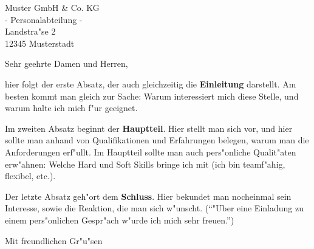 \documentclass[fontsize=12pt]{scrlttr2}
\begin{document}
 \begin{letter}{Muster GmbH \& Co. KG\\- Personalabteilung -\\
		     Landstra"se 2\\12345 Musterstadt} 		
 
\opening{Sehr geehrte Damen und Herren,}
 
hier folgt der erste Absatz, der auch gleichzeitig die 
\textbf{Einleitung} darstellt. Am besten kommt man gleich zur 
Sache: Warum interessiert mich diese Stelle, und warum halte
ich mich f"ur geeignet.
 
Im zweiten Absatz beginnt der \textbf{ Hauptteil}. Hier stellt 
man sich vor, und hier sollte man anhand von Qualifikationen 
und Erfahrungen belegen, warum man die Anforderungen
erf"ullt. Im Hauptteil sollte man auch pers"onliche Qualit"aten 
erw"ahnen: Welche Hard und Soft Skills bringe ich mit (ich bin 
teamf"ahig, flexibel, etc.).
 
Der letzte Absatz geh"ort dem \textbf{Schluss}. Hier bekundet 
man nocheinmal sein Interesse, sowie die Reaktion, die man sich 
w"unscht. ("`"Uber eine Einladung zu einem pers"onlichen 
Gespr"ach w"urde ich mich sehr freuen."')
 
\closing{Mit freundlichen Gr"u"sen}
 
 
 
 
\end{letter}
\end{document}
